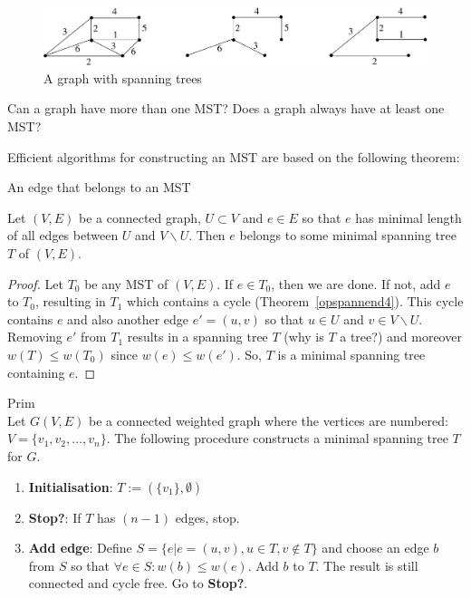 \begin{figure}[ht]
\begin{center}
\includegraphics[width=0.6\linewidth,keepaspectratio]{opspannend1}
\end{center}
\caption{A graph with spanning trees\label{opspannend1}}
\end{figure}

Can a graph have more than one MST? Does a graph always have at least
one MST?

Efficient algorithms for constructing an MST are based on the following
theorem:

\begin{theorem} An edge that belongs to an MST \label{even}

Let $(V,E)$ be a connected graph, $U \subset V$ and $e \in E$
so that $e$ has minimal length of all edges between $U$ and $V
\backslash U$. Then $e$ belongs to some minimal spanning tree $T$ of
$(V,E)$.
\end{theorem} %
\begin{proof} Let $T_{0}$ be any MST of $(V,E)$. If $e \in T_{0}$,
then we are done. If not, add $e$ to $T_{0}$, resulting in $T_{1}$
which contains a cycle (Theorem~\ref{opspannend4}). This cycle
contains $e$ and also another edge $e' = (u,v)$ so that $u \in U$ and
$v \in V \backslash U$. Removing $e'$ from $T_{1}$ results in a
spanning tree $T$ (why is $T$ a tree?) and moreover $w(T) \leq
w(T_{0})$ since $w(e) \leq w(e')$. So, $T$ is a minimal spanning tree
containing $e$.
\end{proof}


\begin{code}Prim\label{prim} \\
  Let $G(V,E)$ be a connected weighted graph where the
vertices are numbered: $V = \{v_{1},v_{2},\ldots,v_{n}\}$. The
following procedure constructs a minimal spanning tree $T$ for $G$.
\begin{enumerate}
\item \textbf{Initialisation}: $T := (\{v_{1}\},\emptyset)$
\item \textbf{Stop?}: If $T$ has $(n-1)$ edges, stop.
\item \textbf{Add edge}:
Define $S = \{e | e = (u,v), u \in T, v \notin T\}$ and choose an edge
$b$ from $S$ so that $\forall e \in S: w(b) \leq w(e)$. Add $b$ to
$T$. The result is still connected and cycle free.
Go to \textbf{Stop?}.
\end{enumerate}
\end{code}

